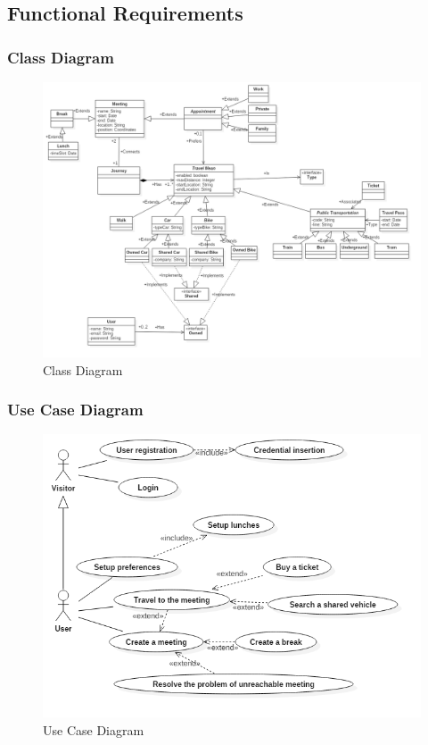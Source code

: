 \subsection{Functional Requirements}
 
\subsubsection{Class Diagram}
\begin{figure}[!htb]
\centering
\includegraphics[scale=0.4]{images/ClassDiagram}
\caption{Class Diagram}
\label{ref:classdiagram}
\end{figure}
 
\clearpage
\subsubsection{Use Case Diagram}
\begin{figure}[!h]
\centering
\includegraphics[scale=0.4]{images/UseCaseDiagram}
\caption{Use Case Diagram}
\label{ref:usecasediagram}
\end{figure}
\clearpage
